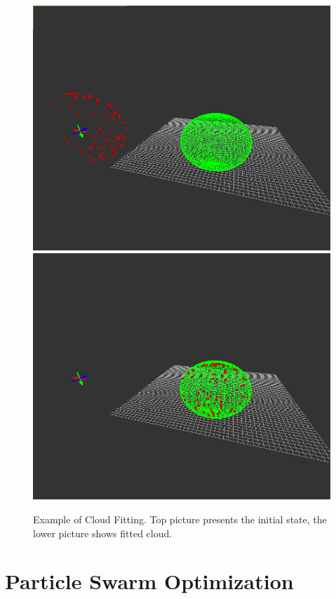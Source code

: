 \documentclass{book}
\begin{document}
\begin{figure}[H]
    \includegraphics[width=1\textwidth]{./graphics/cloud_fitting_init.png}
    \includegraphics[width=1\textwidth]{./graphics/cloud_fitting_after.png}
    \caption{Example of Cloud Fitting. Top picture presents the initial state, the lower picture shows fitted cloud.}
    \label{fig:cloud_fitting}
\end{figure}

\chapter{Particle Swarm Optimization}\label{chap:pso}
\end{document}
